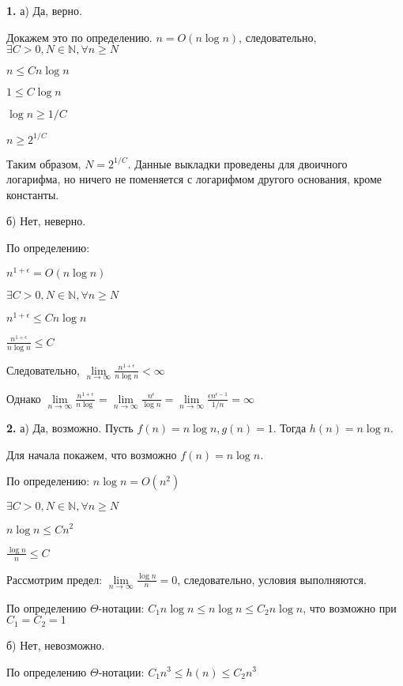 \documentclass[12pt]{extreport}
\begin{document}
	{\bf 1.}  а) Да, верно. 
	
	Докажем это по определению. $ n = O(n\log n)$, следовательно, $ \exists C >0, N \in \mathbb{N}, \forall n  \geqslant N$
	
	$ n \leqslant C n\log n$
	
	$ 1 \leqslant C \log n$
	
	$ \log n \geqslant 1/C$
	
	$ n \geqslant 2^{1/C}$
	
	Таким образом, $ N = 2^{1/C}$. Данные выкладки проведены для двоичного логарифма, но ничего не поменяется с логарифмом другого основания, кроме константы. 
	
	\bigskip
	
	б) Нет, неверно. 
	
	По определению: 
	
	$ n^{1+ \epsilon} = O(n \log n) $
	
	$ \exists C >0, N \in \mathbb{N}, \forall n  \geqslant N$
	
	$ n^{1+ \epsilon} \leqslant C n \log n $
	
	$ \frac{n^{1+ \epsilon}}{ n \log n}  \leqslant  C$
	
	Следовательно, $ \lim \limits_{n \to \infty}  \frac{n^{1+ \epsilon}}{ n \log n} < \infty$
	
	Однако $ \lim \limits_{n \to \infty}  \frac{n^{1+ \epsilon}}{ n \log} = \lim \limits_{n \to \infty}  \frac{n^{ \epsilon}}{ \log n} = \lim \limits_{n \to \infty}  \frac{ \epsilon n^{\epsilon-1}}{ 1/n} = \infty$ 
	\bigskip
	
	{\bf 2.} а) Да, возможно. Пусть $ f(n) = n \log n, g(n) = 1$. Тогда $ h(n) = n \log n $. 
	
	Для начала покажем, что возможно $ f(n) = n \log n$.
	
	По определению: $ n \log n = O(n^2) $
	
	$ \exists C >0, N \in \mathbb{N}, \forall n  \geqslant N$
	
	$ n \log n \leqslant Cn^2 $
	
	$ \frac{ \log n}{n} \leqslant C $
	
	Рассмотрим предел: $ \lim \limits_{n \to \infty}  \frac{\log n}{n} = 0$, следовательно, условия выполняются. 
	
	По определению $\Theta$-нотации: $ C_1 n \log n \leqslant n \log n \leqslant C_2 n \log n $, что  возможно при $C_1 = C_2=1$
	\bigskip
	
	б) Нет, невозможно.
	
	По определению $\Theta$-нотации: $ C_1 n^3 \leqslant h(n) \leqslant C_2 n^3 $
	
\end{document}
